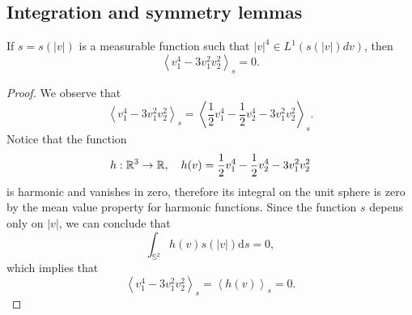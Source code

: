 
\begin{subappendices}
\renewcommand{\thesection}{\Alph{section}}
\renewcommand{\thetheorem}{\thesection.\Roman{theorem}}
\setcounter{theorem}{0}
\renewcommand{\thelemma}{\thesection.\arabic{lemma}}
\setcounter{lemma}{0}
\renewcommand{\theproposition}{\thesection.\arabic{proposition}}
\setcounter{proposition}{0}
\section{Integration and symmetry lemmas} %
\label{sec:integration_and_symmetry_lemmas}


\begin{proposition}  If $s=s(|v|)$ is a measurable function such that 
$|v|^4\in L^1(s(|v|)dv)$, then
\[\left\langle v_1^4-3v_1^2v_2^2\right\rangle_{s}=0.\]
\end{proposition}
\begin{proof}
We observe that \[\left\langle v_1^4-3v_1^2v_2^2\right\rangle_{s}=\left\langle \frac 12 v_1^4-\frac 12 v_2^4-3v_1^2v_2^2\right\rangle_{s}.\]
Notice that the function
\[h:{\mathbb {R}^3}\to {\mathbb {R}},\quad h(v) = \frac 12 v_1^4-\frac 12 v_2^4-3v_1^2v_2^2\]
is harmonic and vanishes in zero, therefore its integral on the unit sphere is zero by the mean value property for harmonic functions. Since the function $s$ depens only on $|v|$, we can conclude that
\[\int_{\mathbb S^2} h(v)s(|v|)\mathrm ds=0,\]
which implies that
\[\left\langle v_1^4-3v_1^2v_2^2\right\rangle_{s}=\left\langle h(v)\right\rangle_{s}=0.\]
\end{proof}


\end{subappendices}
